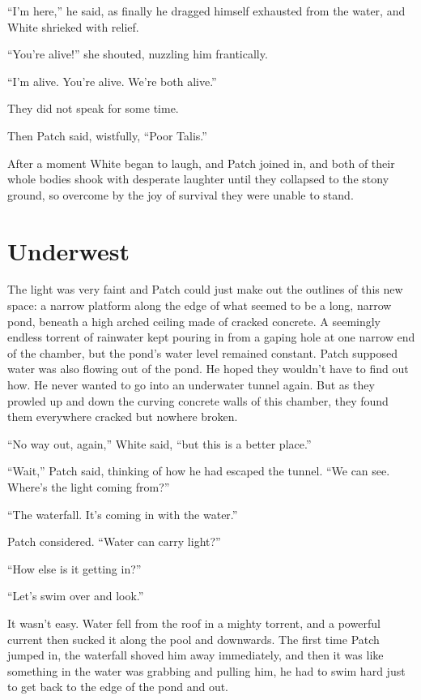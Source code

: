 \documentclass[ebook,oneside,openany,17pt]{memoir}
\newenvironment{tolerant}[1]{%
  \par\tolerance=#1\relax
}{%
  \par
}
\renewcommand{\thechapter}{\Roman{chapter}}
\newcounter{sections}
\newcommand{\sections}[1]{%
  \section*{#1}
  \addtocounter{sections}{1}%
  \pdfbookmark[1]{#1}{section.\thechapter.\thesections}}
\begin{document}
“I’m here,” he said, as finally he dragged himself exhausted from the
water, and White shrieked with relief.

“You’re alive!” she shouted, nuzzling him frantically.

“I’m alive. You’re alive. We’re both alive.”

They did not speak for some time.

Then Patch said, wistfully, “Poor Talis.”

After a moment White began to laugh, and Patch joined in, and both of
their whole bodies shook with desperate laughter until they collapsed
to the stony ground, so overcome by the joy of survival they were
unable to stand.


\sections{Underwest}

\begin{tolerant}{500}
The light was very faint and Patch could just make out the outlines of
this new space: a narrow platform along the edge of what seemed to be
a long, narrow pond, beneath a high arched ceiling made of cracked
concrete. A seemingly endless torrent of rainwater kept pouring in
from a gaping hole at one narrow end of the chamber, but the pond’s
water level remained constant. Patch supposed water was also flowing
out of the pond. He hoped they wouldn’t have to find out how. He never
wanted to go into an underwater tunnel again. But as they prowled up
and down the curving concrete walls of this chamber, they found them
everywhere cracked but no\-where broken.
\end{tolerant}

“No way out, again,” White said, “but this is a better place.”

“Wait,” Patch said, thinking of how he had escaped the tunnel. “We can
see. Where’s the light coming from?”

“The waterfall. It’s coming in with the water.”

Patch considered. “Water can carry light?”

“How else is it getting in?”

“Let’s swim over and look.”

\begin{tolerant}{500}
It wasn’t easy. Water fell from the roof in a mighty torrent, and a
powerful current then sucked it along the pool and downwards. The
first time Patch jump\-ed in, the waterfall shoved him away immediately,
and then it was like something in the water was grabbing and pulling
him, he had to swim hard just to get back to the edge of the pond and
out.
\end{tolerant}
\end{document}
